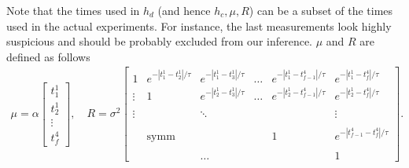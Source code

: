 \documentclass{article}
\begin{document}
Note that the times used in $h_d$ (and hence $h_c, \mu, R$) can be a subset of the times used in the actual experiments. For instance, the last measurements look highly suspicious and should be probably excluded from our inference.
$\mu$ and $R$ are defined as follows
\begin{align*}
 \mu = \alpha
 \begin{bmatrix}
  t_1^1 \\
  t_2^1 \\
  \vdots \\
  t_f^4
 \end{bmatrix}, \quad R = \sigma^2
 \begin{bmatrix}
  1 & e^{-|t_1^1 - t_2^1|/\tau} & e^{-|t_1^1 - t_3^1|/\tau} &  \ldots & e^{-|t_1^1 - t_{f-1}^4|/\tau} & e^{-|t_1^1-t_f^4|/\tau} \\
\vdots & 1 & e^{-|t_2^1 - t_3^1|/\tau} &   \ldots & e^{-|t_2^1 - t_{f-1}^4|/\tau} & e^{-|t_2^1 - t_f^4|/\tau} \\
\\
\vdots &  &  \ddots & &  & \vdots \\
\\
& \text{symm} & & & 1 & e^{-|t_{f-1}^4 - t_f^4|/\tau}  \\
\\
& & \ldots & & & 1
 \end{bmatrix}.
\end{align*}
\end{document}
